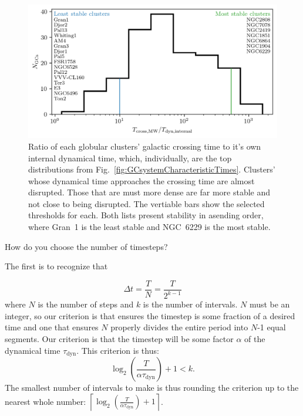         
        \begin{figure}
            \centering
            \includegraphics[width=\linewidth]{images/GCsystemStabilityDynamicalTimeRatios.png}
            \caption{Ratio of each globular clusters' galactic crossing time to it's own internal dynamical time, which, individually, are the top distributions from Fig.~\ref{fig:GCsystemCharacteristicTimes}. Clusters' whose dynamical time approaches the crossing time are almost disrupted. Those that are must more dense are far more stable and not close to being disrupted. The vertiable bars show the selected thresholds for each. Both lists present stability in asending order, where Gran~1 is the least stable and NGC~6229 is the most stable. }
        \end{figure}
        How do you choose the number of timesteps? 

        The first is to recognize that

        \begin{equation}
            \Delta t = \frac{T}{N} = \frac{T}{2^{k-1}}
        \end{equation}
        where $N$ is the number of steps and $k$ is the number of intervals. $N$ must be an integer, so our criterion is that ensures the timestep is some fraction of a desired time and one that ensures $N$ properly divides the entire period into $N$-1 equal segments. Our criterion is that the timestep will be some factor $\alpha$ of the dynamical time $\tau_\mathrm{dyn}$. This criterion is thus: 
        \begin{equation}
            \log_2\left(\frac{T}{\alpha \tau_\mathrm{dyn}}\right) + 1 < k.
        \end{equation}
        The smallest number of intervals to make is thus rounding the criterion up to the nearest whole number: $\left\lceil \log_2\left(\frac{T}{\alpha \tau_\mathrm{dyn}}\right) + 1  \right\rceil$. 
        
